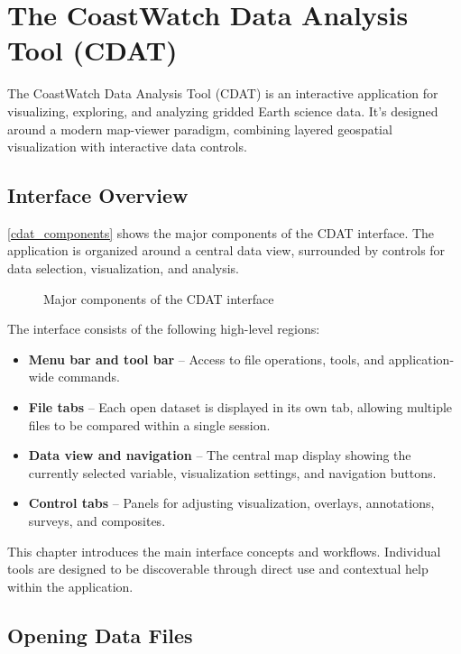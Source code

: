 \chapter{The CoastWatch Data Analysis Tool (CDAT)}
\label{cdatchap}
\hypertarget{cdatchap}{}

The CoastWatch Data Analysis Tool (CDAT) is an interactive application for
visualizing, exploring, and analyzing gridded Earth science data.
It's designed around a modern map-viewer paradigm, combining layered
geospatial visualization with interactive data controls.

\section{Interface Overview}

\autoref{cdat_components} shows the major components of the CDAT
interface.  The application is organized around a central data view,
surrounded by controls for data selection, visualization, and analysis.

\begin{figure}
  \begin{center}
    \caption{Major components of the CDAT interface}
    \label{cdat_components}
  \end{center}
\end{figure}

The interface consists of the following high-level regions:
\begin{itemize}
  \item \textbf{Menu bar and tool bar} -- Access to file operations, tools,
        and application-wide commands.
  \item \textbf{File tabs} -- Each open dataset is displayed in its own tab,
        allowing multiple files to be compared within a single session.
  \item \textbf{Data view and navigation} -- The central map display showing the currently
        selected variable, visualization settings, and navigation buttons.
  \item \textbf{Control tabs} -- Panels for adjusting visualization,
        overlays, annotations, surveys, and composites.
\end{itemize}

This chapter introduces the main interface concepts and workflows.
Individual tools are designed to be discoverable through direct use and
contextual help within the application.

\section{Opening Data Files}

